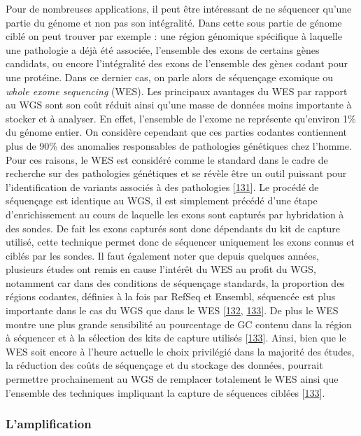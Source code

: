 \documentclass[12pt,a4paper,twoside]{ugathesis}
\theoremstyle{definition}
\theoremstyle{definition}
\theoremstyle{definition}
\theoremstyle{remark}
\begin{document}
Pour de nombreuses applications, il peut être intéressant de ne
séquencer qu'une partie du génome et non pas son intégralité. Dans cette
sous partie de génome ciblé on peut trouver par exemple : une région
génomique spécifique à laquelle une pathologie a déjà été associée,
l'ensemble des exons de certains gènes candidats, ou encore
l'intégralité des exons de l'ensemble des gènes codant pour une
protéine. Dans ce dernier cas, on parle alors de séquençage exomique ou
\emph{whole exome sequencing} (WES). Les principaux avantages du WES par
rapport au WGS sont son coût réduit ainsi qu'une masse de données moins
importante à stocker et à analyser. En effet, l'ensemble de l'exome ne
représente qu'environ 1\% du génome entier. On considère cependant que
ces parties codantes contiennent plus de 90\% des anomalies responsables
de pathologies génétiques chez l'homme. Pour ces raisons, le WES est
considéré comme le standard dans le cadre de recherche sur des
pathologies génétiques et se révèle être un outil puissant pour
l'identification de variants associés à des pathologies
{[}\protect\hyperlink{ref-Ng2010}{131}{]}. Le procédé de séquençage est
identique au WGS, il est simplement précédé d'une étape d'enrichissement
au cours de laquelle les exons sont capturés par hybridation à des
sondes. De fait les exons capturés sont donc dépendants du kit de
capture utilisé, cette technique permet donc de séquencer uniquement les
exons connus et ciblés par les sondes. Il faut également noter que
depuis quelques années, plusieurs études ont remis en cause l'intérêt du
WES au profit du WGS, notamment car dans des conditions de séquençage
standards, la proportion des régions codantes, définies à la fois par
RefSeq et Ensembl, séquencée est plus importante dans le cas du WGS que
dans le WES {[}\protect\hyperlink{ref-Lelieveld2015}{132},
\protect\hyperlink{ref-Meienberg2016}{133}{]}. De plus le WES montre une
plus grande sensibilité au pourcentage de GC contenu dans la région à
séquencer et à la sélection des kits de capture utilisés
{[}\protect\hyperlink{ref-Meienberg2016}{133}{]}. Ainsi, bien que le WES
soit encore à l'heure actuelle le choix privilégié dans la majorité des
études, la réduction des coûts de séquençage et du stockage des données,
pourrait permettre prochainement au WGS de remplacer totalement le WES
ainsi que l'ensemble des techniques impliquant la capture de séquences
ciblées {[}\protect\hyperlink{ref-Meienberg2016}{133}{]}.

\subsubsection{L'amplification}\label{lamplification}
\end{document}
